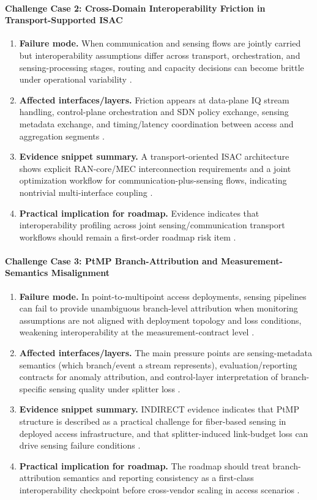 \documentclass[lettersize,journal]{IEEEtran}
\begin{document}
\paragraph{Challenge Case 2: Cross-Domain Interoperability Friction in Transport-Supported ISAC}
\begin{enumerate}
    \item \textbf{Failure mode.} When communication and sensing flows are jointly carried but interoperability assumptions differ across transport, orchestration, and sensing-processing stages, routing and capacity decisions can become brittle under operational variability \cite{O_ISAC_025}.
    \item \textbf{Affected interfaces/layers.} Friction appears at data-plane IQ stream handling, control-plane orchestration and SDN policy exchange, sensing metadata exchange, and timing/latency coordination between access and aggregation segments \cite{O_ISAC_025}.
    \item \textbf{Evidence snippet summary.} A transport-oriented ISAC architecture shows explicit RAN-core/MEC interconnection requirements and a joint optimization workflow for communication-plus-sensing flows, indicating nontrivial multi-interface coupling \cite{O_ISAC_025}.
    \item \textbf{Practical implication for roadmap.} Evidence indicates that interoperability profiling across joint sensing/communication transport workflows should remain a first-order roadmap risk item \cite{O_ISAC_025}.
\end{enumerate}

\paragraph{Challenge Case 3: PtMP Branch-Attribution and Measurement-Semantics Misalignment}
\begin{enumerate}
    \item \textbf{Failure mode.} In point-to-multipoint access deployments, sensing pipelines can fail to provide unambiguous branch-level attribution when monitoring assumptions are not aligned with deployment topology and loss conditions, weakening interoperability at the measurement-contract level \cite{O_ISAC_104}.
    \item \textbf{Affected interfaces/layers.} The main pressure points are sensing-metadata semantics (which branch/event a stream represents), evaluation/reporting contracts for anomaly attribution, and control-layer interpretation of branch-specific sensing quality under splitter loss \cite{O_ISAC_104}.
    \item \textbf{Evidence snippet summary.} INDIRECT evidence indicates that PtMP structure is described as a practical challenge for fiber-based sensing in deployed access infrastructure, and that splitter-induced link-budget loss can drive sensing failure conditions \cite{O_ISAC_104}.
    \item \textbf{Practical implication for roadmap.} The roadmap should treat branch-attribution semantics and reporting consistency as a first-class interoperability checkpoint before cross-vendor scaling in access scenarios \cite{O_ISAC_104}.
\end{enumerate}
\end{document}
